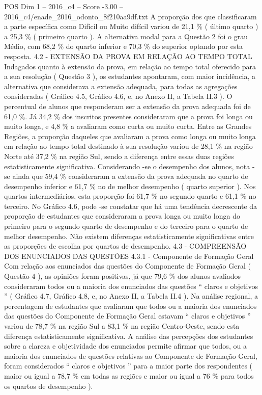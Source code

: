 \begin{textsample}{POS Dim 1 – 2016\_c4 – Score -3.00 – 2016\_c4/enade\_2016\_odonto\_8f210aa9df.txt}
A proporção dos que classificaram a parte específica como Difícil ou Muito difícil variou de 21,1 \% ( último quarto ) a 25,3 \% ( primeiro quarto ).
A alternativa modal para a Questão 2 foi o grau Médio, com 68,2 \% do quarto inferior e 70,3 \% do superior optando por esta resposta. 4.2 - EXTENSÃO DA PROVA EM RELAÇÃO AO TEMPO TOTAL Indagados quanto à extensão da prova, em relação ao tempo total oferecido para a sua resolução ( Questão 3 ), os estudantes apontaram, com maior incidência, a alternativa que considerava a extensão adequada, para todas as agregações consideradas ( Gráfico 4.5, Gráfico 4.6, e, no Anexo II, a Tabela II.3 ).
O percentual de alunos que responderam ser a extensão da prova adequada foi de 61,0 \%.
Já 34,2 \% dos inscritos presentes consideraram que a prova foi longa ou muito longa, e 4,8 \% a avaliaram como curta ou muito curta.
Entre as Grandes Regiões, a proporção daqueles que avaliaram a prova como longa ou muito longa em relação ao tempo total destinado à sua resolução variou de 28,1 \% na região Norte até 37,2 \% na região Sul, sendo a diferença entre essas duas regiões estatisticamente significativa.
Considerando -se o desempenho dos alunos, nota -se ainda que 59,4 \% consideraram a extensão da prova adequada no quarto de desempenho inferior e 61,7 \% no de melhor desempenho ( quarto superior ).
Nos quartos intermediários, esta proporção foi 61,7 \% no segundo quarto e 61,1 \% no terceiro.
No Gráfico 4.6, pode -se constatar que há uma tendência decrescente da proporção de estudantes que consideraram a prova longa ou muito longa do primeiro para o segundo quarto de desempenho e do terceiro para o quarto de melhor desempenho.
Não existem diferenças estatisticamente significativas entre as proporções de escolha por quartos de desempenho. 4.3 - COMPREENSÃO DOS ENUNCIADOS DAS QUESTÕES 4.3.1 - Componente de Formação Geral Com relação aos enunciados das questões do Componente de Formação Geral ( Questão 4 ), as opiniões foram positivas, já que 79,6 \% dos alunos avaliados consideraram todos ou a maioria dos enunciados das questões “ claros e objetivos ” ( Gráfico 4.7, Gráfico 4.8, e, no Anexo II, a Tabela II.4 ).
Na análise regional, a percentagem de estudantes que avaliaram que todos ou a maioria dos enunciados das questões do Componente de Formação Geral estavam “ claros e objetivos ” variou de 78,7 \% na região Sul a 83,1 \% na região Centro-Oeste, sendo esta diferença estatisticamente significativa.
A análise das percepções dos estudantes sobre a clareza e objetividade dos enunciados permite afirmar que todos, ou a maioria dos enunciados de questões relativas ao Componente de Formação Geral, foram considerados “ claros e objetivos ” para a maior parte dos respondentes ( maior ou igual a 78,7 \% em todas as regiões e maior ou igual a 76 \% para todos os quartos de desempenho ).

\end{textsample}
